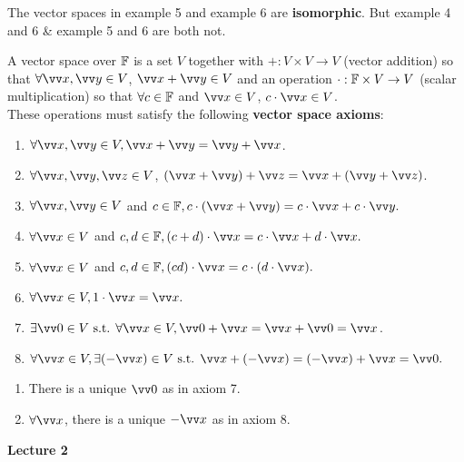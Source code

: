 \begin{note}
    The vector spaces in example 5 and example 6 are \textbf{isomorphic}. But example 4 and 6 \& example 5 and 6 are both not.
\end{note}

\begin{definition}
    A vector space over ${\mathbb{F}}$ is a set $V$ together with $+: V \times V \to V$ (vector addition)
    so that $\forall \vx, \vy \in V$, $\vx + \vy \in V$ and an operation $\cdot : {\mathbb{F}} \times V \to V$ (scalar multiplication)
    so that $\forall c \in {\mathbb{F}}$ and $\vx \in V$, $c \cdot \vx \in V$. \\

    These operations must satisfy the following \textbf{vector space axioms}:
    \begin{enumerate}
        \item $\forall \vx, \vy \in V, \vx + \vy = \vy + \vx$.
        \item $\forall \vx, \vy, \vz \in V$, $(\vx + \vy) + \vz = \vx + (\vy + \vz)$.
        \item $\forall \vx, \vy \in V$ and $c \in \F, c \cdot (\vx + \vy) = c \cdot \vx + c \cdot \vy.$
        \item $\forall \vx \in V$ and $c, d \in \F, (c + d) \cdot \vx = c \cdot \vx + d \cdot \vx.$
        \item $\forall \vx \in V$ and $c, d \in \F, (cd) \cdot \vx = c \cdot (d \cdot \vx).$
        \item $\forall \vx \in V, 1 \cdot \vx = \vx.$
        \item $\exists \vzero \in V \st \forall \vx \in V, \vzero + \vx = \vx + \vzero = \vx$.
        \item $\forall \vx \in V, \exists (-\vx) \in V \st \vx + (-\vx) =  (-\vx) + \vx = \vzero.$
    \end{enumerate}
\end{definition}

\begin{remark}
    \phantom{}
    \begin{enumerate}
        \item There is a unique $\vzero$ as in axiom 7.
        \item $\forall \vx$, there is a unique $-\vx$ as in axiom 8.
    \end{enumerate}
\end{remark}

\makebox[\linewidth]{\hrulefill}
{\large \textbf{Lecture 2}}

